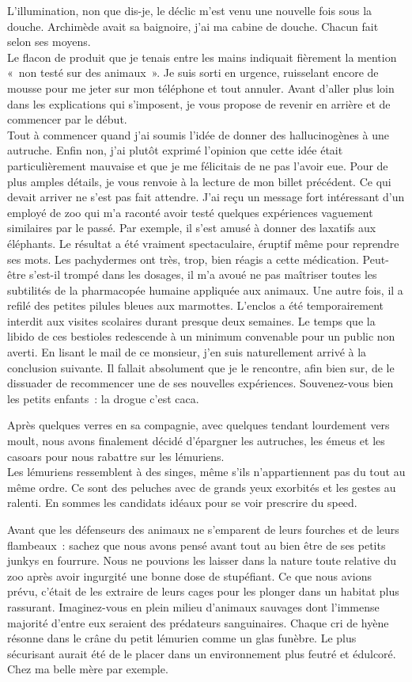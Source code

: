 ﻿L’illumination, non que dis-je, le déclic m’est venu une nouvelle fois sous la douche. Archimède avait sa baignoire, j’ai ma cabine de douche. Chacun fait selon ses moyens.\\
Le flacon de produit que je tenais entre les mains indiquait fièrement la mention « non testé sur des animaux ». Je suis sorti en urgence, ruisselant encore de mousse pour me jeter sur mon téléphone et tout annuler. Avant d’aller plus loin dans les explications qui s’imposent, je vous propose de revenir en arrière et de commencer par le début. \\
Tout à commencer quand j’ai soumis l’idée de donner des hallucinogènes à une autruche. Enfin non, j’ai plutôt exprimé l’opinion que cette idée était particulièrement mauvaise et que je me félicitais de ne pas l’avoir eue. Pour de plus amples détails, je vous renvoie à la lecture de mon billet précédent. Ce qui devait arriver ne s’est pas fait attendre. J’ai reçu un message fort intéressant d’un employé de zoo qui m’a raconté avoir testé quelques expériences vaguement similaires par le passé. Par exemple, il s’est amusé à donner des laxatifs aux éléphants. Le résultat a été vraiment spectaculaire, éruptif même pour reprendre ses mots. Les pachydermes ont très, trop, bien réagis a cette médication. Peut-être s’est-il trompé dans les dosages, il m’a avoué ne pas maîtriser toutes les subtilités de la pharmacopée humaine appliquée aux animaux. Une autre fois, il a refilé des petites pilules bleues aux marmottes. L’enclos a été temporairement interdit aux visites scolaires durant presque deux semaines. Le temps que la libido de ces bestioles redescende à un minimum convenable pour un public non averti. 
En lisant le mail de ce monsieur, j’en suis naturellement arrivé à la conclusion suivante. Il fallait absolument que je le rencontre, afin bien sur, de le dissuader de recommencer une de ses nouvelles expériences. Souvenez-vous bien les petits enfants : la drogue c’est caca. 

Après quelques verres en sa compagnie, avec quelques tendant lourdement vers moult, nous avons finalement décidé d’épargner les autruches, les émeus et les casoars pour nous rabattre sur les lémuriens.\\
Les lémuriens ressemblent à des singes, même s’ils n’appartiennent pas du tout au même ordre. Ce sont des peluches avec de grands yeux exorbités et les gestes au ralenti. En sommes les candidats idéaux pour se voir prescrire du speed.

Avant que les défenseurs des animaux ne s’emparent de leurs fourches et de leurs flambeaux : sachez que nous avons pensé avant tout au bien être de ses petits junkys en fourrure. Nous ne pouvions les laisser dans la nature toute relative du zoo après avoir ingurgité une bonne dose de stupéfiant. Ce que nous avions prévu, c’était de les extraire de leurs cages pour les plonger dans un habitat plus rassurant. Imaginez-vous en plein milieu d’animaux sauvages dont l’immense majorité d'entre eux seraient des prédateurs sanguinaires. Chaque cri de hyène résonne dans le crâne du petit lémurien comme un glas funèbre. Le plus sécurisant aurait été de le placer dans un environnement plus feutré et édulcoré. Chez ma belle mère par exemple.


